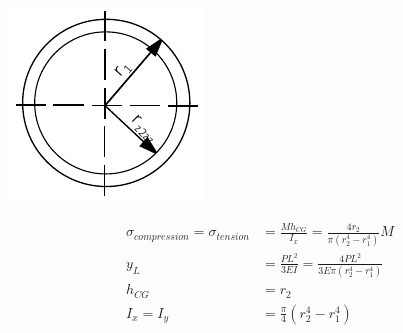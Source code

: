   \noindent\begin{minipage}{0.2\textwidth}%
      \includegraphics[width=\linewidth]{figures/profile_cylinder.pdf}
  \end{minipage}%
  \hfill%
  \begin{minipage}{0.8\textwidth}
    \begin{equation}
      \begin{aligned}
      \sigma _{compression} = \sigma _{tension} &= \frac{M h_{CG}}{I_x} = \frac{4 r_2}{\pi(r_2 ^4 - r_1 ^4)} M \\
      y_L &= \frac{P L^2}{3EI} = \frac{4 P L^2}{3 E \pi(r_2 ^4 - r_1 ^4)}\\
      h_{CG} &= r_2 \\
      I_x = I_y &= \frac{\pi}{4} (r_2 ^4 - r_1 ^4)
      \end{aligned}
    \end{equation}
  \end{minipage}


